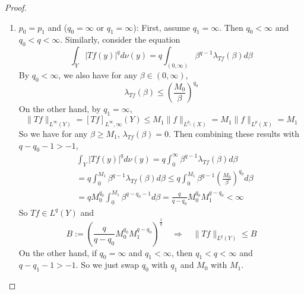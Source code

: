 \begin{proof}
\begin{enumerate}[label=(\Roman*)]
\begin{enumerate}[label=\theenumi-\arabic{*}]
			\item $p_0 = p_1$ and ($q_0 = \infty$ or $q_1 = \infty$): First, assume $q_1 = \infty$. Then $q_0 < \infty$ and $q_0 < q < \infty$. Similarly, consider the equation
			\begin{equation*}
				\int_Y|T f(y)|^q d \nu(y)=q \int_{(0, \infty)} \beta^{q-1} \lambda_{T f}(\beta) d \beta
			\end{equation*}
			By $q_0 < \infty$, we also have for any $\beta \in (0,\infty)$,
			\begin{equation*}
				\lambda_{T f}(\beta) \leq\left(\frac{M_0}{\beta}\right)^{q_0}
			\end{equation*}
			On the other hand, by $q_1 = \infty$,
			\begin{equation*}
				\|T f\|_{L^{\infty}(Y)}=[T f]_{L^{\infty}, \infty}(Y) \leq M_1\|f\|_{L^{p_1}(X)}=M_1\|f\|_{L^p(X)}=M_1
			\end{equation*}
			So we have for any $\beta \geq M_1$, $\lambda_{Tf}(\beta) = 0$. Then combining these results with $q-q_0-1>-1$,
			\begin{equation*}
				\begin{aligned}
					& \int_Y|T f(y)|^q d \nu(y)=q \int_0^{\infty} \beta^{q-1} \lambda_{T f}(\beta) d \beta \\
					& =q \int_0^{M_1} \beta^{q-1} \lambda_{T f}(\beta) d \beta \leq q \int_0^{M_1} \beta^{q-1}\left(\frac{M_0}{\beta}\right)^{q_0} d \beta \\
					& =q M_0^{q_0} \int_0^{M_1} \beta^{q-q_0-1} d \beta=\frac{q}{q-q_0} M_0^{q_0} M_1^{q-q_0}<\infty
				\end{aligned}
			\end{equation*}
			So $Tf \in L^q(Y)$ and 
			\begin{equation*}
				B:=\left(\frac{q}{q-q_0} M_0^{q_0} M_1^{q-q_0}\right)^{\frac{1}{q}}\quad \Rightarrow \quad \|T f\|_{L^q(Y)} \leq B
			\end{equation*}
			On the other hand, if $q_0 = \infty$ and $q_1 < \infty$, then $q_1 < q < \infty$ and $q-q_1-1>-1$. So we just swap $q_0$ with $q_1$ and $M_0$ with $M_1$.
		\end{enumerate}


\end{enumerate}
\end{proof}

